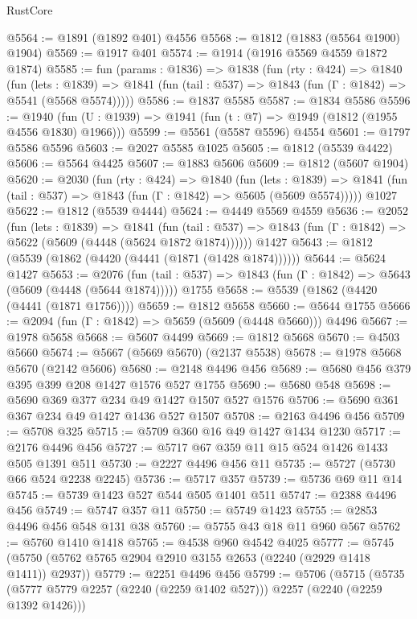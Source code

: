 \begin{lexlean}{RustCore}
\begin{coremodule}
@5564 := @1891 (@1892 @401) @4556
@5568 := @1812 (@1883 (@5564 @1900) @1904)
@5569 := @1917 @401
@5574 := @1914 (@1916 @5569 @4559 @1872 @1874)
@5585 := fun (params : @1836) =>
  @1838
    (fun (rty : @424) =>
    @1840
      (fun (lets : @1839) =>
      @1841 (fun (tail : @537) => @1843 (fun (Γ : @1842) => @5541 (@5568 @5574)))))
@5586 := @1837 @5585
@5587 := @1834 @5586
@5596 := @1940 (fun (U : @1939) => @1941 (fun (t : @7) => @1949 (@1812 (@1955 @4556 @1830) @1966)))
@5599 := @5561 (@5587 @5596) @4554
@5601 := @1797 @5586 @5596
@5603 := @2027 @5585 @1025
@5605 := @1812 (@5539 @4422)
@5606 := @5564 @4425
@5607 := @1883 @5606
@5609 := @1812 (@5607 @1904)
@5620 := @2030
    (fun (rty : @424) =>
    @1840
      (fun (lets : @1839) =>
      @1841 (fun (tail : @537) => @1843 (fun (Γ : @1842) => @5605 (@5609 @5574)))))
    @1027
@5622 := @1812 (@5539 @4444)
@5624 := @4449 @5569 @4559
@5636 := @2052
    (fun (lets : @1839) =>
    @1841
      (fun (tail : @537) => @1843 (fun (Γ : @1842) => @5622 (@5609 (@4448 (@5624 @1872 @1874))))))
    @1427
@5643 := @1812 (@5539 (@1862 (@4420 (@4441 (@1871 (@1428 @1874))))))
@5644 := @5624 @1427
@5653 := @2076
    (fun (tail : @537) => @1843 (fun (Γ : @1842) => @5643 (@5609 (@4448 (@5644 @1874)))))
    @1755
@5658 := @5539 (@1862 (@4420 (@4441 (@1871 @1756))))
@5659 := @1812 @5658
@5660 := @5644 @1755
@5666 := @2094 (fun (Γ : @1842) => @5659 (@5609 (@4448 @5660))) @4496
@5667 := @1978 @5658
@5668 := @5607 @4499
@5669 := @1812 @5668
@5670 := @4503 @5660
@5674 := @5667 (@5669 @5670) (@2137 @5538)
@5678 := @1978 @5668 @5670 (@2142 @5606)
@5680 := @2148 @4496 @456
@5689 := @5680 @456 @379 @395 @399 @208 @1427 @1576 @527 @1755
@5690 := @5680 @548
@5698 := @5690 @369 @377 @234 @49 @1427 @1507 @527 @1576
@5706 := @5690 @361 @367 @234 @49 @1427 @1436 @527 @1507
@5708 := @2163 @4496 @456
@5709 := @5708 @325
@5715 := @5709 @360 @16 @49 @1427 @1434 @1230
@5717 := @2176 @4496 @456
@5727 := @5717 @67 @359 @11 @15 @524 @1426 @1433 @505 @1391 @511
@5730 := @2227 @4496 @456 @11
@5735 := @5727 (@5730 @66 @524 @2238 @2245)
@5736 := @5717 @357
@5739 := @5736 @69 @11 @14
@5745 := @5739 @1423 @527 @544 @505 @1401 @511
@5747 := @2388 @4496 @456
@5749 := @5747 @357 @11
@5750 := @5749 @1423
@5755 := @2853 @4496 @456 @548 @131 @38
@5760 := @5755 @43 @18 @11 @960 @567
@5762 := @5760 @1410 @1418
@5765 := @4538 @960 @4542 @4025
@5777 := @5745 (@5750 (@5762 @5765 @2904 @2910 @3155 @2653 (@2240 (@2929 @1418 @1411)) @2937))
@5779 := @2251 @4496 @456
@5799 := @5706
    (@5715
      (@5735 (@5777 @5779 @2257 (@2240 (@2259 @1402 @527))) @2257 (@2240 (@2259 @1392 @1426)))

\end{coremodule}
\end{lexlean}
